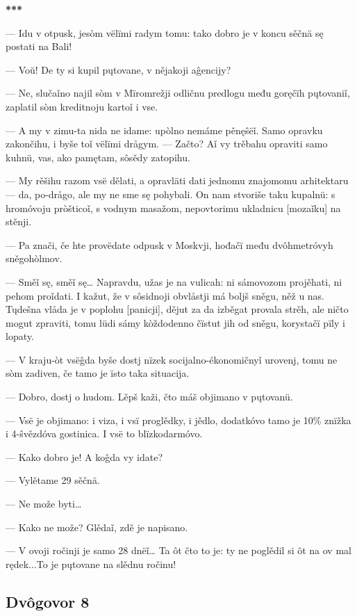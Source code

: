 \begin{center}
	\textbf{***}
\end{center}

— Idu v otpusk, jesòm vëlïmi radym tomu: tako dobro je v koncu sěčnä sę postati na Bali!

— Voŭ! De ty si kupil pųtovane, v nějakoji aĝencijy?

— Ne, slučaǐno najil sòm v Mïromrežji odličnu predlogu među goręčïh pųtovaniǐ, zaplatil sòm kreditnoju kartoǐ i vse.

— A my v zimu-ta nida ne idame: upòlno nemáme pěnęŝëǐ. Samo opravku zakončihu, i byše toǐ vëlïmi drågym.
— Začto? Aǐ vy trěbahu opraviti samo kuhnü, vas, ako pamętam, sôsědy zatopihu.

— My rěšihu razom vsë dělati, a opravläti dati jednomu znajomomu arhitektaru — da, po-drågo, ale my ne sme sę pohybali. On nam stvoriše taku kupalnü: s hromóvoju pròšticoǐ, s vodnym masažom, nepovtorimu ukladnicu [mozaǐku] na stěnji.

— Pa znači, če hte provëdate odpusk v Moskvji, hođačï među dvôhmetróvyh sněgohòlmov.

— Směǐ sę, směǐ sę… Napravdu, užas je na vulicah: ni sámovozom projěhati, ni pehom proǐdati. I kažut, že v sôsidnoji obvlåstji má boljš sněgu, něž u nas. Tųdešna vlåda je v poplohu [panicji], dějut za da izběgat provala strěh, ale ničto mogut zpraviti, tomu lüdi sámy kòždodenno čïstut jih od sněgu, korystačï pïly i lopaty.

— V kraju-òt vsëĝda byše dostj nïzek socijalno-ékonomičnyǐ urovenj, tomu ne sòm zadiven, če tamo je ïsto taka situacija.

— Dobro, dostj o hudom. Lěpš kaži, čto máš objimano v pųtovanü.

— Vsë je objimano: i viza, i vsï proglědky, i jědlo, dodatkóvo tamo je 10\% znïžka i 4-ŝvězdóva gostinica. I vsë to blïzkodarmóvo.

— Kako dobro je! A koĝda vy idate?

— Vylětame 29 sěčnä.

— Ne može byti…

— Kako ne može? Glědaǐ, zdě je napisano.

— V ovoji ročinji je samo 28 dnëǐ… Ta ôt čto to je: ty ne poglědil si ôt na ov mal rędek...To je pųtovane na slědnu ročinu!


\subsection{Dvôgovor 8}


